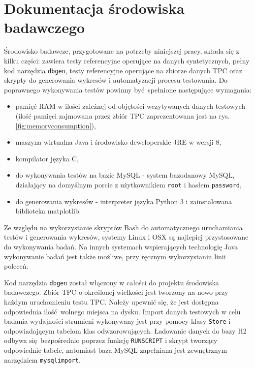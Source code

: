 \documentclass[12pt,twoside,openright]{extarticle}
\begin{document}
\cleardoublepage
\appendix
\section{Dokumentacja środowiska badawczego}

    Środowisko badawcze, przygotowane na potrzeby niniejszej pracy, składa się z kilku części: zawiera testy referencyjne operujące na danych syntetycznych, pełny kod narzędzia \texttt{dbgen}, testy referencyjne operujące na zbiorze danych TPC oraz skrypty do generowania wykresów i automatyzacji procesu testowania. Do poprawnego wykonywania testów powinny być spełnione następujące wymagania:
    
\begin{itemize}
    \item pamięć RAM w ilości zależnej od objętości wczytywanych danych testowych (ilość pamięci zajmowana przez zbiór TPC zaprezentowana jest na rys. \ref{fig:memoryconsumption}),
    \item maszyna wirtualna Java i środowisko deweloperskie JRE w wersji 8,
    \item kompilator języka C,
    \item do wykonywania testów na bazie MySQL - system bazodanowy MySQL, działający na domyślnym porcie z użytkownikiem \texttt{root} i hasłem \texttt{password},
    \item do generowania wykresów - interpreter języka Python 3 i zainstalowana biblioteka matplotlib.
\end{itemize}

    Ze względu na wykorzystanie skryptów Bash do automatycznego uruchamiania testów i generowania wykresów, systemy Linux i OSX są najlepiej przystosowane do wykonywania badań. Na innych systemach wspierających technologię Java wykonywanie badań jest także możliwe, przy ręcznym wykorzystaniu linii poleceń.

    Kod narzędzia \texttt{dbgen} został włączony w całości do projektu środowiska badawczego. Zbiór TPC o określonej wielkości jest tworzony na nowo przy każdym uruchomieniu testu TPC. Należy upewnić się, że jest dostępna odpowiednia ilość wolnego miejsca na dysku. Import danych testowych w celu badania wydajności strumieni wykonywany jest przy pomocy klasy \texttt{Store} i odpowiadającym tabelom klas odwzorowujących. Ładowanie danych do bazy H2 odbywa się bezpośrednio poprzez funkcję \texttt{RUNSCRIPT} i skrypt tworzący odpowiednie tabele, natomiast baza MySQL zapełniana jest zewnętrznym narzędziem \texttt{mysqlimport}.
\end{document}
